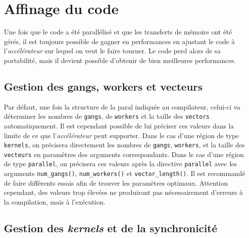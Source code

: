 \documentclass{article}
\begin{document}
\section{Affinage du code}

Une fois que le code a été parallélisé et que les transferts de mémoire ont été gérés, il est toujours possible de gagner en performances en ajustant le code à l'\textit{accélérateur} sur lequel on veut le faire tourner. Le code perd alors de sa portabilité, mais il devient possible d'obtenir de bien meilleures performances.

\subsection{Gestion des gangs, workers et vecteurs}

Par défaut, une fois la structure de la \gls{paral} indiquée au compilateur, celui-ci va déterminer les nombres de \texttt{gangs}, de \texttt{workers} et la taille des \texttt{vectors} automatiquement. Il est cependant possible de lui préciser ces valeurs dans la limite de ce que l'\textit{accélérateur} peut supporter. Dans le cas d'une région de type \texttt{kernels}, on précisera directement les nombres de \texttt{gangs}, \texttt{workers}, et la taille des \texttt{vecteurs} en paramètres des arguments correspondants. Dans le cas d'une région de type \texttt{parallel}, on précisera ces valeurs après la directive \texttt{parallel} avec les arguments \texttt{num\_gangs()}, \texttt{num\_workers()} et \texttt{vector\_length()}. Il est recommandé de faire différents essais afin de trouver les paramètres optimaux. Attention cependant, des valeurs trop élevées ne produiront pas nécessairement d'erreurs à la compilation, mais à l'exécution.

\subsection{Gestion des \textit{kernels} et de la synchronicité}
\end{document}

